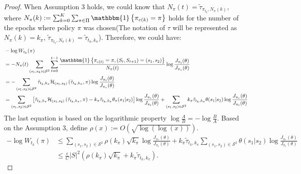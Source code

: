 \begin{lemma}
\begin{proof}
When Assumption 3 holds, we could know that $N_{\pi}(t) = \tilde{\tau}_{\pi_{t_{k}},N_{\pi}(k)}$, where $N_{\pi}(k) :=\sum_{k=0}^{K}\sum_{\pi \in \Pi} \mathbbm{1}\left\{\pi_{e(k)}=\pi\right\} $ holds for the number of the epochs where policy $\pi$ was chosen(The notation of $\tau$ will be represented as $N_{\pi}(k) = k_{\pi}$, $\tilde{\tau}_{\pi_{t_{k}},N_{\pi}(k)} = \tilde{\tau}_{t_{k},k_{\pi}}$). Therefore, we could have:
\begin{equation}
\begin{aligned}
& -\log W_{t_{k}}(\pi)\\
& = -N_{\pi}(t) \sum_{\left(s_{1}, s_{2}\right) \in \mathcal{S}^{2}} \sum_{t=0}^{t-1} \frac{\mathbbm{1}\left\{\pi_{e(t)}=\pi,\left(S_{t}, S_{t+1}\right)=\left(s_{1}, s_{2}\right)\right\}}{N_{\pi}(t)}\log \frac{J_{\pi_{t}}(\theta)}{J_{\pi_{*}}(\theta)}\\
& = -\sum_{\left(s_{1}, s_{2}\right) \in \mathcal{S}^{2}} \tilde{\tau}_{t_{k},k_{\pi}}  \mathcal{H}_{\left(s_{1}, s_{2}\right)}\left(\tilde{\tau}_{t_{k},k_{\pi}}, \pi\right) \log \frac{J_{\pi_{t}}(\theta)}{J_{\pi_{*}}(\theta)}\\
& = \sum_{\left(s_{1}, s_{2}\right) \in \mathcal{S}^{2}} \left[\tilde{\tau}_{t_{k},k_{\pi}}  \mathcal{H}_{\left(s_{1}, s_{2}\right)}\left(\tilde{\tau}_{t_{k},k_{\pi}}, \pi\right) - k_{\pi}\tilde{\tau}_{t_{k},k_{\pi}}\theta_{\pi}(s_{1}|s_{2})\right]\log \frac{J_{\pi_{*}}(\theta)}{J_{\pi_{t}}(\theta)} + \sum_{\left(s_{1}, s_{2}\right) \in \mathcal{S}^{2}} k_{\pi}\tilde{\tau}_{t_{k},k_{\pi}}\theta(s_{1}|s_{2}) \log \frac{J_{\pi_{*}}(\theta)}{J_{\pi_{t}}(\theta)}\\
\end{aligned}
\end{equation}
The last equation is based on the logarithmic property $\log \frac{A}{B} = - \log \frac{B}{A}$. Based on the Assumption 3, define $\rho(x) := O(\sqrt{\log (\log(x))})$.
\begin{equation}
\begin{aligned}
- \log W_{t_{k}}(\pi)& \leq \sum_{\left(s_{1}, s_{2}\right) \in \mathcal{S}^{2}} \rho(k_{\pi}) \sqrt{k_{\pi}} \log \frac{J_{\pi_{*}}(\theta)}{J_{\pi_{t}}(\theta)}+ k_{\pi}\tilde{\tau}_{t_{k},k_{\pi}} \sum_{\left(s_{1}, s_{2}\right) \in \mathcal{S}^{2}}\theta(s_{1}|s_{2}) \log \frac{J_{\pi_{*}}(\theta)}{J_{\pi_{t}}(\theta)}\\
& \leq \frac{\epsilon}{C}|S|^{2}(  \rho(k_{\pi}) \sqrt{k_{\pi}} + k_{\pi} \tilde{\tau}_{t_{k},k_{\pi}}).
\end{aligned}
\end{equation}
\end{proof}
\end{lemma}

